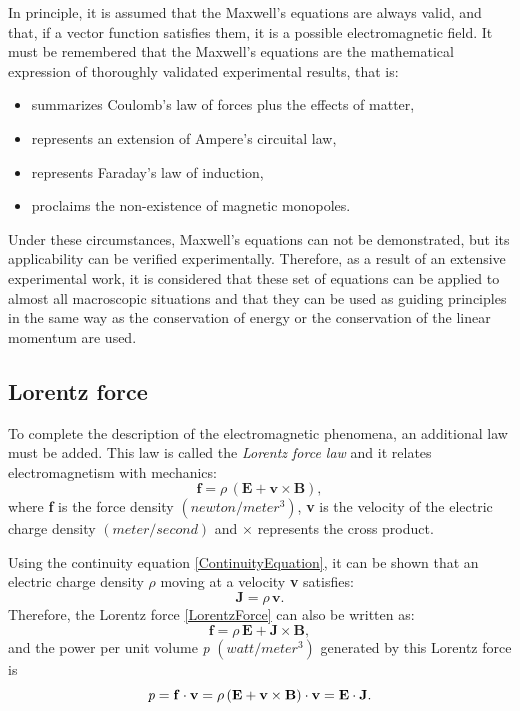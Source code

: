 In principle, it is assumed that the Maxwell's equations are always valid, and that, if a vector function satisfies them, it is a possible electromagnetic field. It must be remembered that the Maxwell's equations are the mathematical expression of thoroughly validated experimental results, that is:
\begin{itemize}
	\itemsep0em 
    \item[\eqref{MaxwellDivD}] summarizes Coulomb's law of forces plus the effects of matter,
	\item[\eqref{MaxwellRotH}] represents an extension of Ampere's circuital law,
	\item[\eqref{MaxwellRotE}] represents Faraday's law of induction,
	\item[\eqref{MaxwellDivB}] proclaims the non-existence of magnetic monopoles.
\end{itemize}
\newpage
\noindent Under these circumstances, Maxwell's equations can not be demonstrated, but its applicability can be verified experimentally. Therefore, as a result of an extensive experimental work, it is considered that these set of equations can be applied to almost all macroscopic situations and that they can be used as guiding principles in the same way as the conservation of energy or the conservation of the linear momentum are used.

\subsection{Lorentz force}

To complete the description of the electromagnetic phenomena, an additional law must be added. This law is called the \emph{Lorentz force law} and 
it relates electromagnetism with mechanics:
\begin{equation}
	\mathbf{f} = \rho\,(\mathbf{E} + \mathbf{v}\times\mathbf{B}), \label{LorentzForce}
\end{equation}
where \textbf{f} is the force density $\left(newton/meter^{3}\right)$, \textbf{v} is the velocity of the electric charge density $\left(meter/second\right)$ and $\times$ represents the cross product.

Using the continuity equation \eqref{ContinuityEquation}, it can be shown that an electric charge density $\rho$ moving at a velocity \textbf{v} satisfies:
\begin{equation}\label{Jrhov}
	\textbf{J} = \rho\,\textbf{v}.
\end{equation}
Therefore, the Lorentz force \eqref{LorentzForce} can also be written as:
\begin{equation}
	\mathbf{f} = \rho\,\mathbf{E} + \mathbf{J}\times\mathbf{B}, \label{LorentzForceJ}
\end{equation}
and the power per unit volume \emph{p} $\left(watt/meter^{3}\right)$ generated by this Lorentz force is
\begin{equation}
	\emph{p} = \mathbf{f}\cdot\mathbf{v} =  \rho\,(\mathbf{E} + \mathbf{v}\times\mathbf{B})\cdot\mathbf{v} = \mathbf{E}\cdot\mathbf{J}.\label{PowerLorentzForce}
\end{equation}

